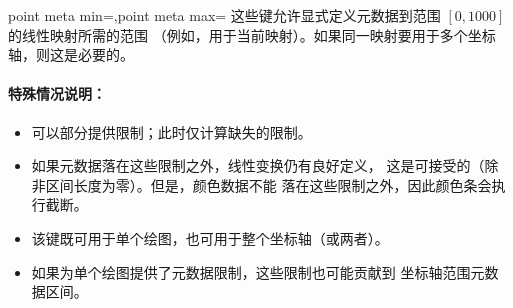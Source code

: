 \begin{pgfplotskeylist}{point meta min=,point meta max=}
    这些键允许显式定义元数据到范围 $[0,1000]$ 的线性映射所需的范围
    （例如，用于当前映射）。如果同一映射要用于多个坐标轴，则这是必要的。


    \paragraph{特殊情况说明：}

    \begin{itemize}
        \item 可以部分提供限制；此时仅计算缺失的限制。
        \item 如果元数据落在这些限制之外，线性变换仍有良好定义，
            这是可接受的（除非区间长度为零）。但是，颜色数据不能
            落在这些限制之外，因此颜色条会执行截断。
        \item 该键既可用于单个绘图，也可用于整个坐标轴（或两者）。
        \item 如果为单个绘图提供了元数据限制，这些限制也可能贡献到
            坐标轴范围元数据区间。
    \end{itemize}
\end{pgfplotskeylist}

